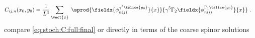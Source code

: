 \begin{align}
C_{ij,n}(x_0, y_0)
&=
\frac{1}{L^{3}} \sum_{\vect{x}} \;
\sprod{
  \fieldx{\phi_{n(j)}^{\gamma^{5} \tslice{y_0}}}{x}
}{
  \gamma^{5}
  \Gamma_2
  \fieldx{ \phi_{n(i)}^{\Gamma_1 \tslice{y_0}} }{x}
} \;.
\end{align}
compare \cref{eq:stoch:C:full:final} or directly in terms of the coarse spinor solutions
